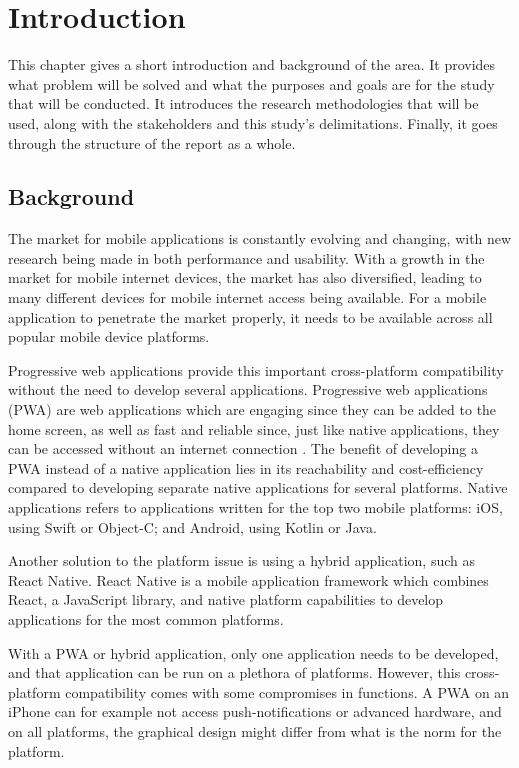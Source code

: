 \section{Introduction}

This chapter gives a short introduction and background of the area. It provides what problem will be solved and what the purposes and goals are for the study that will be conducted. It introduces the research methodologies that will be used, along with the stakeholders and this study's delimitations. Finally, it goes through the structure of the report as a whole.

\subsection{Background}

The market for mobile applications is constantly evolving and changing, with new research being made in both performance and usability. With a growth in the market for mobile internet devices, the market has also diversified, leading to many different devices for mobile internet access being available. For a mobile application to penetrate the market properly, it needs to be available across all popular mobile device platforms. 

Progressive web applications provide this important cross-platform compatibility \cite{PWAGoogle} without the need to develop several applications. 
Progressive web applications (PWA) are web applications which are engaging since they can be added to the home screen, as well as fast and reliable since, just like native applications, they can be accessed without an internet connection \cite{PWAGoogle}. The benefit of developing a PWA instead of a native application lies in its reachability and cost-efficiency compared to developing separate native applications for several platforms. Native applications refers to applications written for the top two mobile platforms: iOS, using Swift or Object-C; and Android, using Kotlin or Java. 

Another solution to the platform issue is using a hybrid application, such as React Native. React Native is a mobile application framework which combines React, a JavaScript library, and native platform capabilities to develop applications for the most common platforms.

With a PWA or hybrid application, only one application needs to be developed, and that application can be run on a plethora of platforms. However, this cross-platform compatibility comes with some compromises in functions. A PWA on an iPhone can for example not access push-notifications or advanced hardware, and on all platforms, the graphical design might differ from what is the norm for the platform.

